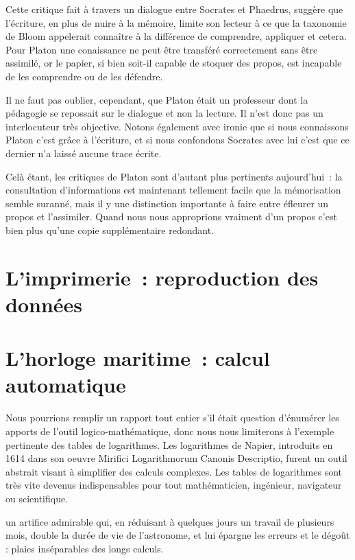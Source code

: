 Cette critique fait à travers un dialogue entre Socrates et Phaedrus, suggère que l'écriture, en plus de nuire à la mémoire, limite son lecteur à ce que la taxonomie de Bloom\cite{tax-bloom} appelerait \og{}connaître\fg{} à la différence de \og{}comprendre\fg{}, \og{}appliquer\fg{} et cetera. Pour Platon une conaissance ne peut être transféré correctement sans être assimilé, or le papier, si bien soit-il capable de stoquer des propos, est incapable de les comprendre ou de les défendre. 

Il ne faut pas oublier, cependant, que Platon était un professeur dont la pédagogie se repossait sur le dialogue et non la lecture. Il n'est donc pas un interlocuteur très objective. Notons également avec ironie que si nous connaissons Platon c'est grâce à l'écriture, et si nous confondons Socrates avec lui c'est que ce dernier n'a laissé aucune trace écrite.

Celà étant, les critiques de Platon sont d'autant plus pertinents aujourd'hui~: la consultation d'informations est maintenant tellement facile que la mémorisation semble suranné, mais il y une distinction importante à faire entre éfleurer un propos et l'assimiler. Quand nous nous approprions vraiment d'un propos c'est bien plus qu'une copie supplémentaire redondant.

\chapter{L'imprimerie~: reproduction des données}


\chapter{L'horloge maritime~: calcul automatique}
Nous pourrions remplir un rapport tout entier s'il était question d'énumérer les apports de l'outil logico-mathématique, donc nous nous limiterons à l'exemple pertinente des tables de logarithmes. Les logarithmes de Napier, introduits en 1614 dans son oeuvre \og{}Mirifici Logarithmorum Canonis Descriptio\fg{}, furent un outil abstrait visant à simplifier des calculs complexes. Les tables de logarithmes sont très vite devenus indispensables pour tout mathématicien, ingénieur, navigateur ou scientifique.

\begin{coolquote} un artifice admirable qui, en réduisant à quelques jours un travail de plusieurs mois, double la durée de vie de l'astronome, et lui épargne les erreurs et le dégoût : plaies inséparables des longs calculs.
\end{coolquote}

